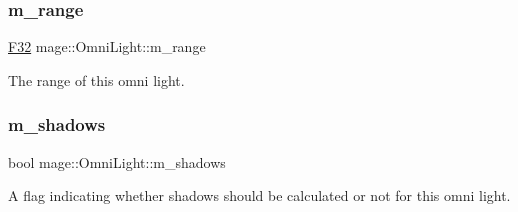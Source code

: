 \subsubsection{\texorpdfstring{m\+\_\+range}{m\_range}}
{\footnotesize\ttfamily \hyperlink{namespacemage_aa97e833b45f06d60a0a9c4fc22ae02c0}{F32} mage\+::\+Omni\+Light\+::m\+\_\+range\hspace{0.3cm}{\ttfamily [private]}}

The range of this omni light. \hypertarget{classmage_1_1_omni_light_a63e5dab12be5021815e98c81dd9aed6a}{}\label{classmage_1_1_omni_light_a63e5dab12be5021815e98c81dd9aed6a} 
\subsubsection{\texorpdfstring{m\+\_\+shadows}{m\_shadows}}
{\footnotesize\ttfamily bool mage\+::\+Omni\+Light\+::m\+\_\+shadows\hspace{0.3cm}{\ttfamily [private]}}

A flag indicating whether shadows should be calculated or not for this omni light. 